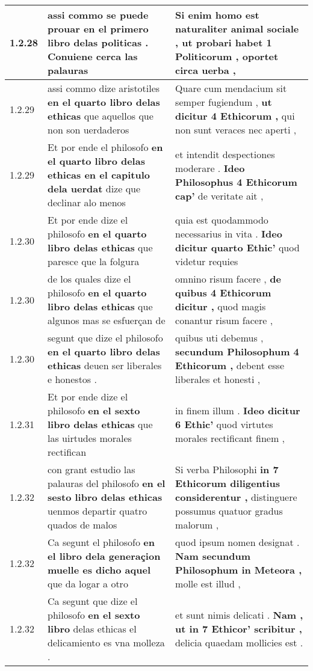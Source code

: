 \begin{tabular}{|p{1cm}|p{6.5cm}|p{6.5cm}|}
1.2.28 & assi commo se puede prouar \textbf{ en el primero libro delas politicas . } Conuiene cerca las palauras & Si enim homo est naturaliter animal sociale , \textbf{ ut probari habet 1 Politicorum , } oportet circa uerba , \\\hline
1.2.29 & assi commo dize aristotiles \textbf{ en el quarto libro delas ethicas } que aquellos que non son uerdaderos & Quare cum mendacium sit semper fugiendum , \textbf{ ut dicitur 4 Ethicorum , } qui non sunt veraces nec aperti , \\\hline
1.2.29 & Et por ende el philosofo \textbf{ en el quarto libro delas ethicas en el capitulo dela uerdat } dize que declinar alo menos & et intendit despectiones moderare . \textbf{ Ideo Philosophus 4 Ethicorum cap’ } de veritate ait , \\\hline
1.2.30 & Et por ende dize el philosofo \textbf{ en el quarto libro delas ethicas } que paresce que la folgura & quia est quodammodo necessarius in vita . \textbf{ Ideo dicitur quarto Ethic’ } quod videtur requies \\\hline
1.2.30 & de los quales dize el philosofo \textbf{ en el quarto libro delas ethicas } que algunos mas se esfuerçan de & omnino risum facere , \textbf{ de quibus 4 Ethicorum dicitur , } quod magis conantur risum facere , \\\hline
1.2.30 & segunt que dize el philosofo \textbf{ en el quarto libro delas ethicas } deuen ser liberales e honestos . & quibus uti debemus , \textbf{ secundum Philosophum 4 Ethicorum , } debent esse liberales et honesti , \\\hline
1.2.31 & Et por ende dize el philosofo \textbf{ en el sexto libro delas ethicas } que las uirtudes morales rectifican & in finem illum . \textbf{ Ideo dicitur 6 Ethic’ } quod virtutes morales rectificant finem , \\\hline
1.2.32 & con grant estudio las palauras del philosofo \textbf{ en el sesto libro delas ethicas } uenmos departir quatro quados de malos & Si verba Philosophi \textbf{ in 7 Ethicorum diligentius considerentur , } distinguere possumus quatuor gradus malorum , \\\hline
1.2.32 & Ca segunt el philosofo \textbf{ en el libro dela generaçion muelle es dicho aquel } que da logar a otro & quod ipsum nomen designat . \textbf{ Nam secundum Philosophum in Meteora , } molle est illud , \\\hline
1.2.32 & Ca segunt que dize el philosofo \textbf{ en el sexto libro } delas ethicas el delicamiento es vna molleza . & et sunt nimis delicati . \textbf{ Nam , ut in 7 Ethicor’ scribitur , } delicia quaedam mollicies est . \\\hline

\end{tabular}
